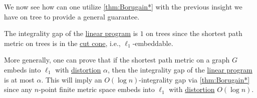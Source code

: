 We now see how can one utilize \autoref{thm:Borugain*} with the previous insight we have on tree to provide a general guarantee.

\begin{prev}
	The integrality gap of the \hyperref[eq:non-uniform-sparsest-cut-LP-primal]{linear program} is \(1\) on trees since the shortest path metric on trees is in the \hyperref[def:cut-cone]{cut cone}, i.e., \(\ell _1\)-embeddable.
\end{prev}

More generally, one can prove that if the shortest path metric on a graph \(G\) embeds into \(\ell _1\) with \hyperref[def:distortion]{distortion} \(\alpha \), then the integrality gap of the \hyperref[eq:non-uniform-sparsest-cut-LP-primal]{linear program} is at most \(\alpha \). This will imply an \(O(\log n)\)-integrality gap via \autoref{thm:Borugain*} since any \(n\)-point finite metric space embeds into \(\ell _1\) with \hyperref[def:distortion]{distortion} \(O(\log n)\).